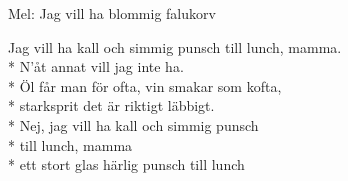 \begin{SongText}
    \begin{SongInfo}
        Mel: Jag vill ha blommig falukorv
    \end{SongInfo}
    \begin{SongVerse}
        Jag vill ha kall och simmig punsch till lunch, mamma.\\*%
        N'åt annat vill jag inte ha.\\*%
        Öl får man för ofta, vin smakar som kofta,\\*%
        starksprit det är riktigt läbbigt.\\*%
        Nej, jag vill ha kall och simmig punsch\\*%
        till lunch, mamma\\*%
        ett stort glas härlig punsch till lunch
    \end{SongVerse}\end{SongText}
